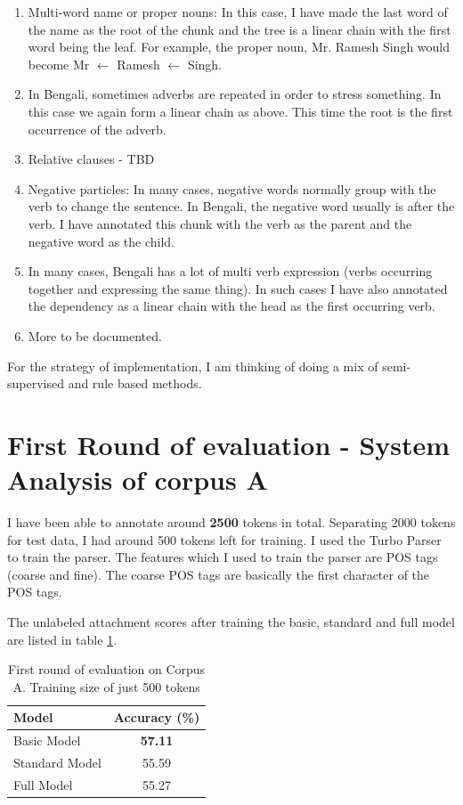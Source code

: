 \documentclass[11pt,letterpaper]{article}
\begin{document}
\begin{enumerate}
\item Multi-word name or proper nouns: In this case, I have made the last word of the name as the root of the chunk and the tree is a linear chain with the first word being the leaf. For example, the proper noun, Mr. Ramesh Singh would become Mr $\leftarrow$ Ramesh $\leftarrow$ Singh.
\item In Bengali, sometimes adverbs are repeated in order to stress something. In this case we again form a linear chain as above. This time the root is the first occurrence of the adverb.
\item Relative clauses - TBD
\item Negative particles: In many cases, negative words normally group with the verb to change the sentence. In Bengali, the negative word usually is after the verb. I have annotated this chunk with the verb as the parent and the negative word as the child.
\item In many cases, Bengali has a lot of multi verb expression (verbs occurring together and expressing the same thing). In such cases I have also annotated the dependency as a linear chain with the head as the first occurring verb.
\item More to be documented.
\end{enumerate}

For the strategy of implementation, I am thinking of doing a  mix of semi-supervised and rule based methods.

\section{First Round of evaluation - System Analysis of corpus A}
I have been able to annotate around \textbf{2500} tokens in total. Separating 2000 tokens for test data, I had around 500 tokens left for training. I used the Turbo Parser \citep{MSXAF10} to train the parser. The features which I used to train the parser are POS tags (coarse and fine). The coarse POS tags are basically the first character of the POS tags. 

 The unlabeled attachment scores after training the basic, standard and full model are listed in table \ref{First}.
\begin{table}
\begin{center}
  \begin{tabular}{ l | c }
  \hline
  Model & Accuracy (\%)\\
  \hline
  Basic Model & \textbf{57.11} \\
  Standard Model & 55.59 \\
  Full Model & 55.27 \\
  \hline
   \end{tabular}
\end{center}
\caption{First round of evaluation on Corpus A. Training size of just 500 tokens}
\label{First}
\end{table}
\end{document}
